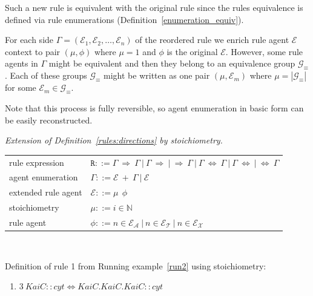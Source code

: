 \documentclass[12pt]{fithesis2}
\begin{document}
Such a new rule is equivalent with the original rule since the rules equivalence is defined via rule enumerations (Definition~\ref{enumeration_equiv}).

For each side $\Gamma = (\mathcal{E}_1, \mathcal{E}_2, \ldots, \mathcal{E}_n)$ of the reordered rule we enrich rule agent $\mathcal{E}$ context to pair $(\mu, \phi)$ where $\mu = 1$ and $\phi$ is the original $\mathcal{E}$. However, some rule agents in $\Gamma$ might be equivalent and then they belong to an equivalence group $\mathcal{G}_\equiv$. Each of these groups $\mathcal{G}_\equiv$ might be written as one pair $(\mu, \mathcal{E}_m)$ where $\mu = |\mathcal{G}_\equiv|$ for some $\mathcal{E}_m \in \mathcal{G}_\equiv$.

Note that this process is fully reversible, so agent enumeration in basic form can be easily reconstructed.

\begin{definition}\label{rules:stoichiometry}
\emph{Extension of Definition~\ref{rules:directions} by stoichiometry.}

\begin{center}
{\small
\hspace*{-1cm}\begin{tabular}{ l l }
 rule expression & $\mathtt{R} ::= \Gamma ~\Rightarrow~ \Gamma ~|~ \Gamma ~\Rightarrow ~|~ \Rightarrow~ \Gamma ~|~ \Gamma ~\Leftrightarrow~ \Gamma ~|~ \Gamma ~\Leftrightarrow ~|~ \Leftrightarrow~ \Gamma $\\
 agent enumeration & $\Gamma ::= \mathcal{E}~ +~\Gamma ~|~ \mathcal{E}$\\
 extended rule agent & $\mathcal{E} ::= \mu ~~ \phi$\\
 stoichiometry & $\mu ::= i \in \mathbb{N}$\\
 rule agent & $\phi ::= n \in \mathcal{E}_\mathcal{A}~|~n \in \mathcal{E}_\mathcal{T}~|~n \in \mathcal{E}_\mathcal{X}$\\
\end{tabular}
}
\end{center}
\end{definition}

\begin{runningExample}\label{run3}
$ $

\noindent Definition of rule 1 from Running example~\ref{run2} using stoichiometry:
\begin{enumerate}
\item $3~KaiC::cyt \Leftrightarrow KaiC.KaiC.KaiC::cyt$
\end{enumerate}
\end{runningExample}
\end{document}
